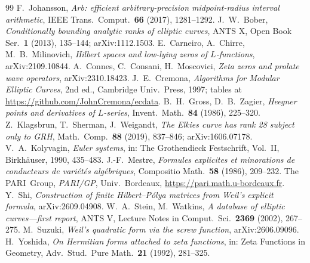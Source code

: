 \documentclass[11pt]{amsart}
\theoremstyle{remark}
\theoremstyle{definition}
\begin{document}
\begin{thebibliography}{99}
 F.~Johansson, \emph{Arb: efficient arbitrary-precision midpoint-radius interval arithmetic}, IEEE Trans.\ Comput.\ \textbf{66} (2017), 1281--1292.
 J.~W.~Bober, \emph{Conditionally bounding analytic ranks of elliptic curves}, ANTS X, Open Book Ser.\ \textbf{1} (2013), 135--144; arXiv:1112.1503.
 E.~Carneiro, A.~Chirre, M.~B.~Milinovich, \emph{Hilbert spaces and low-lying zeros of $L$-functions}, arXiv:2109.10844.
 A.~Connes, C.~Consani, H.~Moscovici, \emph{Zeta zeros and prolate wave operators}, arXiv:2310.18423.
 J.~E.~Cremona, \emph{Algorithms for Modular Elliptic Curves}, 2nd ed., Cambridge Univ.\ Press, 1997; tables at \url{https://github.com/JohnCremona/ecdata}.
 B.~H.~Gross, D.~B.~Zagier, \emph{Heegner points and derivatives of $L$-series}, Invent.\ Math.\ \textbf{84} (1986), 225--320.
 Z.~Klagsbrun, T.~Sherman, J.~Weigandt, \emph{The Elkies curve has rank 28 subject only to GRH}, Math.\ Comp.\ \textbf{88} (2019), 837--846; arXiv:1606.07178.
 V.~A.~Kolyvagin, \emph{Euler systems}, in: The Grothendieck Festschrift, Vol.~II, Birkh\"auser, 1990, 435--483.
 J.-F.~Mestre, \emph{Formules explicites et minorations de conducteurs de vari\'et\'es alg\'ebriques}, Compositio Math.\ \textbf{58} (1986), 209--232.
 The PARI~Group, \emph{PARI/GP}, Univ.\ Bordeaux, \url{https://pari.math.u-bordeaux.fr}.
 Y.~Shi, \emph{Construction of finite Hilbert--P\'olya matrices from Weil's explicit formula}, arXiv:2609.04908.
 W.~A.~Stein, M.~Watkins, \emph{A database of elliptic curves---first report}, ANTS V, Lecture Notes in Comput.\ Sci.\ \textbf{2369} (2002), 267--275.
 M.~Suzuki, \emph{Weil's quadratic form via the screw function}, arXiv:2606.09096.
 H.~Yoshida, \emph{On Hermitian forms attached to zeta functions}, in: Zeta Functions in Geometry, Adv.\ Stud.\ Pure Math.\ \textbf{21} (1992), 281--325.
\end{thebibliography}
\end{document}
